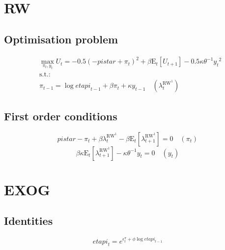 

\section{RW}

\subsection{Optimisation problem}

\begin{align}
&\max_{\pi_{t}, y_{t}
} U_{t} = -0.5\left(-{p\!i\!s\!t\!a\!r} + \pi_{t}\right)^{2} + {\beta} {\mathrm{E}_{t}\left[U_{t+1}\right]} - 0.5{\kappa} {\theta}^{-1} {y_{t}}^{2}\\
&\mathrm{s.t.:}\nonumber\\
& \pi_{t-1} = \log{{e\!t\!a\!p\!i}_{t-1}} + {\beta} {\pi_{t}} + {\kappa} {y_{t-1}} \quad \left(\lambda^{\mathrm{RW}^{\mathrm{1}}}_{t}\right)
\end{align}


\subsection{First order conditions}

\begin{equation}
{p\!i\!s\!t\!a\!r} - \pi_{t} + {\beta} {\lambda^{\mathrm{RW}^{\mathrm{1}}}_{t}} - {\beta} {\mathrm{E}_{t}\left[\lambda^{\mathrm{RW}^{\mathrm{1}}}_{t+1}\right]} = 0
 \quad \left(\pi_{t}\right)
\end{equation}
\begin{equation}
{\beta} {\kappa} {\mathrm{E}_{t}\left[\lambda^{\mathrm{RW}^{\mathrm{1}}}_{t+1}\right]} - {\kappa} {\theta}^{-1} {y_{t}} = 0
 \quad \left(y_{t}\right)
\end{equation}




\section{EXOG}

\subsection{Identities}

\begin{equation}
{e\!t\!a\!p\!i}_{t} = e^{\epsilon^{\pi}_{t} + {\phi} {\log{{e\!t\!a\!p\!i}_{t-1}}}}
\end{equation}




